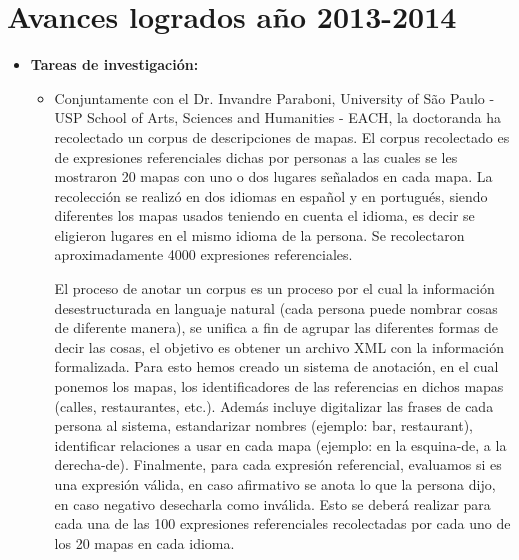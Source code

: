 \section{Avances logrados a\~no 2013-2014 }
\label{progreso}

\begin{itemize}
\item \textbf{Tareas de investigaci\'on:}
\begin{itemize}

\item Conjuntamente con el Dr. Invandre Paraboni, University of S\~ao Paulo - USP 
School of Arts, Sciences and Humanities - EACH, la doctoranda ha recolectado un corpus de descripciones de mapas. El corpus recolectado es de expresiones referenciales dichas por personas a las cuales se les mostraron 20 mapas con uno o dos lugares se\~nalados en cada mapa. La recolecci\'on se realiz\'o en dos idiomas en espa\~nol y en portugu\'es, siendo diferentes los mapas usados teniendo en cuenta el idioma, es decir se eligieron lugares en el mismo idioma de la persona. Se recolectaron aproximadamente 4000 expresiones referenciales. 

El proceso de anotar un corpus es un proceso por el cual la informaci\'on desestructurada en languaje natural (cada persona puede nombrar cosas de diferente manera), se unifica a fin de agrupar las diferentes formas de decir las cosas, el objetivo es obtener un archivo XML con la informaci\'on formalizada.
Para esto hemos creado un sistema de anotaci\'on, en el cual ponemos los mapas, los identificadores de las referencias en dichos mapas (calles, restaurantes, etc.). Adem\'as incluye digitalizar las frases de cada persona al sistema, estandarizar nombres (ejemplo: bar, restaurant), identificar relaciones a usar en cada mapa (ejemplo: en la esquina-de, a la derecha-de). Finalmente, para cada expresi\'on referencial, evaluamos si es una expresi\'on v\'alida, en caso afirmativo se anota lo que la persona dijo, en caso negativo desecharla como inv\'alida. Esto se deber\'a realizar para cada una de las 100 expresiones referenciales recolectadas por cada uno de los 20 mapas en cada idioma.
 

\end{itemize}
\end{itemize}
